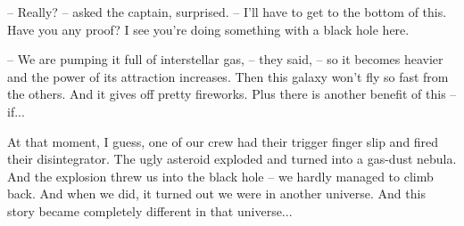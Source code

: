 \documentclass[ebook,oneside,final,openright]{memoir}
\begin{document}
– Really? – asked the captain, surprised. – I’ll have to get to the bottom of this. Have you any proof? I see you’re doing something with a black hole here.\par
– We are pumping it full of interstellar gas, – they said, – so it becomes heavier and the power of its attraction increases. Then this galaxy won’t fly so fast from the others. And it gives off pretty fireworks. Plus there is another benefit of this – if...\par
At that moment, I guess, one of our crew had their trigger finger slip and fired their disintegrator. The ugly asteroid exploded and turned into a gas-dust nebula. And the explosion threw us into the black hole – we hardly managed to climb back. And when we did, it turned out we were in another universe. And this story became completely different in that universe...
\end{document}
